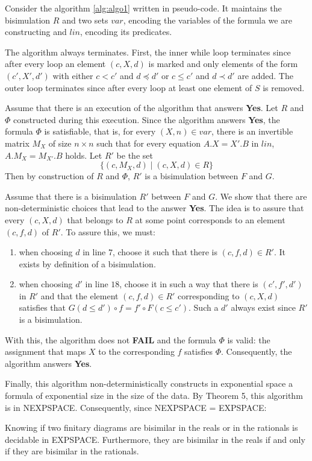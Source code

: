 Consider the algorithm \ref{alg:algo1} written in pseudo-code. It maintains the bisimulation $R$ and two sets $var$, encoding the variables of the formula we are constructing and $lin$, encoding its predicates.

The algorithm always terminates. First, the inner while loop terminates since after every loop an element $(c,X,d)$ is marked and only elements of the form $(c',X',d')$ with either $c < c'$ and $d \preceq d'$ or $c \leq c'$ and $d \prec d'$ are added. The outer loop terminates since after every loop at least one element of $S$ is removed.

Assume that there is an execution of the algorithm that answers \textbf{Yes}. Let $R$ and $\Phi$ constructed during this execution. Since the algorithm answers \textbf{Yes}, the formula $\Phi$ is satisfiable, that is, for every $(X,n) \in var$, there is an invertible matrix $M_X$ of size $n\times n$ such that for every equation $A.X=X'.B$ in $lin$, $A.M_X = M_{X'}.B$ holds. Let $R'$ be the set 
$$\{(c,M_X,d) \mid (c,X,d) \in R\}$$
Then by construction of $R$ and $\Phi$, $R'$ is a bisimulation between $F$ and $G$.

 Assume that there is a bisimulation $R'$ between $F$ and $G$. We show that there are non-deterministic choices that lead to the answer \textbf{Yes}. The idea is to assure that every $(c,X,d)$ that belongs to $R$ at some point corresponds to an element $(c,f,d)$ of $R'$. To assure this, we must:
\begin{enumerate}
	\item when choosing $d$ in line $7$, choose it such that there is $(c,f,d) \in R'$. It exists by definition of a bisimulation.
	\item when choosing $d'$ in line $18$, choose it in such a way that there is $(c',f',d')$ in $R'$ and that the element $(c,f,d) \in R'$ corresponding to $(c,X,d)$ satisfies that $G(d\leq d')\circ f = f'\circ F(c\leq c')$. Such a $d'$ always exist since $R'$ is a bisimulation.
\end{enumerate}
With this, the algorithm does not \textbf{FAIL} and the formula $\Phi$ is valid: the assignment that maps $X$ to the corresponding $f$ satisfies $\Phi$. Consequently, the algorithm answers \textbf{Yes}.

Finally, this algorithm non-deterministically constructs in exponential space a formula of exponential size in the size of the data. By Theorem 5, this algorithm is in NEXPSPACE. Consequently, since NEXPSPACE = EXPSPACE:
\begin{theo}
Knowing if two finitary diagrams are bisimilar in the reals or in the rationals is decidable in EXPSPACE. Furthermore, they are bisimilar in the reals if and only if they are bisimilar in the rationals.
\end{theo}


